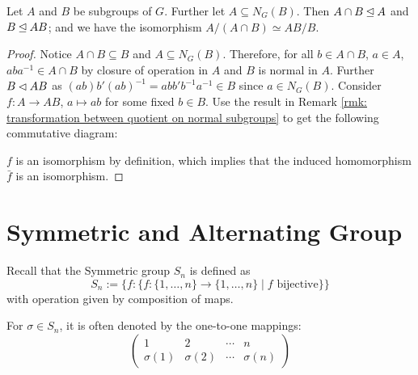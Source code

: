 \documentclass{article}
\begin{document}
\begin{theorem}
    Let $A$ and $B$ be subgroups of $G$. Further let $A \subseteq N_G(B)$. Then $A \cap B \unlhd A$ and $B \unlhd AB$; and we have the isomorphism $A/(A \cap B) \simeq AB/B$.
\end{theorem}

\begin{proof}
    Notice $A \cap B \subseteq B$ and $A \subseteq N_G(B)$. Therefore, for all $b \in A \cap B$, $a \in A$, $aba^{-1} \in A \cap B$ by closure of operation in $A$ and $B$ is normal in $A$. Further $B \lhd AB$ as $(ab) b' (ab)^{-1} = abb'b^{-1} a^{-1} \in B$ since $a \in N_G(B)$. Consider $f: A \to AB$, $a \mapsto ab$ for some fixed $b \in B$. Use the result in Remark \ref{rmk: transformation between quotient on normal subgroups} to get the following commutative diagram:

    \begin{minipage}{\linewidth}
        \centering
    \end{minipage}
    $f$ is an isomorphism by definition, which implies that the induced homomorphism $\bar{f}$ is an isomorphism.
\end{proof}

\section{Symmetric and Alternating Group}

Recall that the Symmetric group $S_n$ is defined as 
\[
    S_n := \{ f: \{ f: \{1, \dots, n\} \to \{1, \dots, n\} \mid f \text{ bijective} \} \}
\]
with operation given by composition of maps.

\begin{notation}
    For $\sigma \in S_n$, it is often denoted by the one-to-one mappings:
    \[
        \begin{pmatrix}
            1 & 2 & \cdots & n \\
            \sigma(1) & \sigma(2) & \cdots & \sigma(n)
        \end{pmatrix}
    \]
\end{notation}
\end{document}
